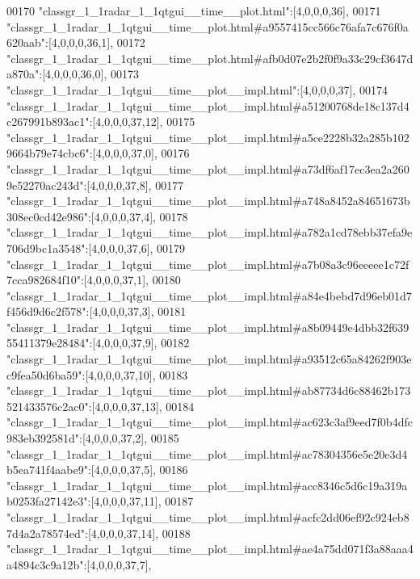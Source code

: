 \begin{DoxyCode}
00170 \textcolor{stringliteral}{"classgr\_1\_1radar\_1\_1qtgui\_\_time\_\_plot.html"}:[4,0,0,0,36],
00171 \textcolor{stringliteral}{"classgr\_1\_1radar\_1\_1qtgui\_\_time\_\_plot.html#a9557415cc566c76afa7c676f0a620aab"}:[4,0,0,0,36,1],
00172 \textcolor{stringliteral}{"classgr\_1\_1radar\_1\_1qtgui\_\_time\_\_plot.html#afb0d07e2b2f0f9a33c29cf3647da870a"}:[4,0,0,0,36,0],
00173 \textcolor{stringliteral}{"classgr\_1\_1radar\_1\_1qtgui\_\_time\_\_plot\_\_impl.html"}:[4,0,0,0,37],
00174 \textcolor{stringliteral}{"classgr\_1\_1radar\_1\_1qtgui\_\_time\_\_plot\_\_impl.html#a51200768de18c137d4c267991b893ac1"}:[4,0,0,0,37,12],
00175 \textcolor{stringliteral}{"classgr\_1\_1radar\_1\_1qtgui\_\_time\_\_plot\_\_impl.html#a5ce2228b32a285b1029664b79e74cbc6"}:[4,0,0,0,37,0],
00176 \textcolor{stringliteral}{"classgr\_1\_1radar\_1\_1qtgui\_\_time\_\_plot\_\_impl.html#a73df6af17ec3ea2a2609e52270ac243d"}:[4,0,0,0,37,8],
00177 \textcolor{stringliteral}{"classgr\_1\_1radar\_1\_1qtgui\_\_time\_\_plot\_\_impl.html#a748a8452a84651673b308ec0cd42e986"}:[4,0,0,0,37,4],
00178 \textcolor{stringliteral}{"classgr\_1\_1radar\_1\_1qtgui\_\_time\_\_plot\_\_impl.html#a782a1cd78ebb37efa9e706d9bc1a3548"}:[4,0,0,0,37,6],
00179 \textcolor{stringliteral}{"classgr\_1\_1radar\_1\_1qtgui\_\_time\_\_plot\_\_impl.html#a7b08a3c96eeeee1c72f7cca982684f10"}:[4,0,0,0,37,1],
00180 \textcolor{stringliteral}{"classgr\_1\_1radar\_1\_1qtgui\_\_time\_\_plot\_\_impl.html#a84e4bebd7d96eb01d7f456d9d6c2f578"}:[4,0,0,0,37,3],
00181 \textcolor{stringliteral}{"classgr\_1\_1radar\_1\_1qtgui\_\_time\_\_plot\_\_impl.html#a8b09449e4dbb32f63955411379e28484"}:[4,0,0,0,37,9],
00182 \textcolor{stringliteral}{"classgr\_1\_1radar\_1\_1qtgui\_\_time\_\_plot\_\_impl.html#a93512c65a84262f903ec9fea50d6ba59"}:[4,0,0,0,37,10],
00183 \textcolor{stringliteral}{"classgr\_1\_1radar\_1\_1qtgui\_\_time\_\_plot\_\_impl.html#ab87734d6c88462b173521433576c2ac0"}:[4,0,0,0,37,13],
00184 \textcolor{stringliteral}{"classgr\_1\_1radar\_1\_1qtgui\_\_time\_\_plot\_\_impl.html#ac623c3af9eed7f0b4dfc983eb392581d"}:[4,0,0,0,37,2],
00185 \textcolor{stringliteral}{"classgr\_1\_1radar\_1\_1qtgui\_\_time\_\_plot\_\_impl.html#ac78304356e5e20e3d4b5ea741f4aabe9"}:[4,0,0,0,37,5],
00186 \textcolor{stringliteral}{"classgr\_1\_1radar\_1\_1qtgui\_\_time\_\_plot\_\_impl.html#acc8346c5d6c19a319ab0253fa27142e3"}:[4,0,0,0,37,11],
00187 \textcolor{stringliteral}{"classgr\_1\_1radar\_1\_1qtgui\_\_time\_\_plot\_\_impl.html#acfc2dd06ef92c924eb87d4a2a78574ed"}:[4,0,0,0,37,14],
00188 \textcolor{stringliteral}{"classgr\_1\_1radar\_1\_1qtgui\_\_time\_\_plot\_\_impl.html#ae4a75dd071f3a88aaa4a4894c3c9a12b"}:[4,0,0,0,37,7],

\end{DoxyCode}
